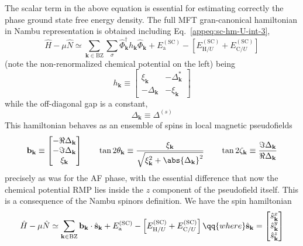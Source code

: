 The scalar term in the above equation is essential for estimating correctly the phase ground state free energy density. The full MFT gran-canonical hamiltonian in Nambu representation is obtained including Eq.~\eqref{appeq:sc-hm-U-int-3},
\begin{equation}\label{appeq:sc-hm-bogoliubov-h}
	\hat H - \mu \hat N \simeq \sum_{\mathbf{k} \in \mathrm{BZ}} \sum_\sigma \hat \Phi_\mathbf{k}^\dagger h_\mathbf{k} \hat \Phi_\mathbf{k} + E_\mathrm{a}^{(\mathrm{SC})}- \left[
		E_{\mathrm{H}/U}^{(\mathrm{SC})} + E_{\mathrm{C}/U}^{(\mathrm{SC})}
	\right]
\end{equation}
(note the non-renormalized chemical potential on the left) being
\[
	h_\mathbf{k} \equiv \begin{bmatrix}
		\xi_\mathbf{k} & -\Delta_\mathbf{k}^* \\
		-\Delta_\mathbf{k} & - \xi_\mathbf{k}
	\end{bmatrix}
\]
while the off-diagonal gap is a constant,
\[
	\Delta_\mathbf{k} \equiv \Delta^{(s)}
\]
This hamiltonian behaves as an ensemble of spins in local magnetic pseudofields
\begin{equation} \label{appeq:sc-hm-pseudofield}
	\mathbf{b}_\mathbf{k} \equiv \begin{bmatrix}
		-\Re{\Delta_\mathbf{k}} \\
		-\Im{\Delta_\mathbf{k}} \\ 
		\xi_\mathbf{k}
	\end{bmatrix}
	\qquad
	\tan 2\theta_\mathbf{k} \equiv \frac{\xi_\mathbf{k}}{\sqrt{\xi_\mathbf{k}^2 + \abs{\Delta_\mathbf{k}}^2}}
	\qquad
	\tan 2\zeta_\mathbf{k} \equiv \frac{\Im{\Delta_\mathbf{k}}}{\Re{\Delta_\mathbf{k}}}
\end{equation}
precisely as was for the AF phase, with the essential difference that now the chemical potential RMP lies inside the $z$ component of the pseudofield itself. This is a consequence of the Nambu spinors definition. We have the spin hamiltonian
\begin{equation}\label{appeq:af-sc-spin-h}
	\hat H -\mu \hat N \simeq \sum_{\mathbf{k} \in \mathrm{BZ}} \mathbf{b}_\mathbf{k} \cdot \hat{\mathbf{s}}_\mathbf{k} + E_\mathrm{a}^{(\mathrm{SC})} - \left[
		E_{\mathrm{H}/U}^{(\mathrm{SC})} + E_{\mathrm{C}/U}^{(\mathrm{SC})}
	\right]
	\qq{where}
	\hat{\mathbf{s}}_\mathbf{k} = \begin{bmatrix}
		\hat s_\mathbf{k}^x \\
		\hat s_\mathbf{k}^y \\
		\hat s_\mathbf{k}^z
	\end{bmatrix}
\end{equation}

